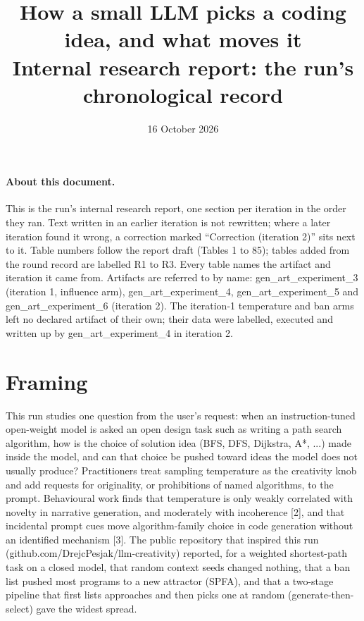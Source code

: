 \documentclass[11pt,letterpaper]{article}
\title{How a small LLM picks a coding idea, and what moves it\\[4pt]\large Internal research report: the run's chronological record}
\date{16 October 2026}
\author{}
\begin{document}
\maketitle

\paragraph{About this document.} This is the run's internal research report, one section per iteration in the order they ran. Text written in an earlier iteration is not rewritten; where a later iteration found it wrong, a correction marked ``Correction (iteration 2)'' sits next to it. Table numbers follow the report draft (Tables 1 to 85); tables added from the round record are labelled R1 to R3. Every table names the artifact and iteration it came from. Artifacts are referred to by name: gen\_art\_experiment\_3 (iteration 1, influence arm), gen\_art\_experiment\_4, gen\_art\_experiment\_5 and gen\_art\_experiment\_6 (iteration 2). The iteration-1 temperature and ban arms left no declared artifact of their own; their data were labelled, executed and written up by gen\_art\_experiment\_4 in iteration 2.

\tableofcontents
\clearpage
\section*{Framing}
This run studies one question from the user's request: when an instruction-tuned open-weight model is asked an open design task such as writing a path search algorithm, how is the choice of solution idea (BFS, DFS, Dijkstra, A*, ...) made inside the model, and can that choice be pushed toward ideas the model does not usually produce? Practitioners treat sampling temperature as the creativity knob and add requests for originality, or prohibitions of named algorithms, to the prompt. Behavioural work finds that temperature is only weakly correlated with novelty in narrative generation, and moderately with incoherence [2], and that incidental prompt cues move algorithm-family choice in code generation without an identified mechanism [3]. The public repository that inspired this run (github.com/DrejcPesjak/llm-creativity) reported, for a weighted shortest-path task on a closed model, that random context seeds changed nothing, that a ban list pushed most programs to a new attractor (SPFA), and that a two-stage pipeline that first lists approaches and then picks one at random (generate-then-select) gave the widest spread.
\end{document}
